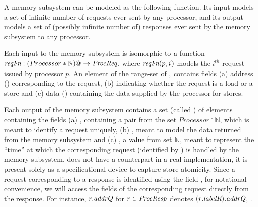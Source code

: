 A memory subsystem can be modeled as the following function. Its input models a
set of infinite number of requests ever sent by any processor, and its output
models a set of (possibly infinite number of) responses ever sent by the memory
subsystem to any processor.

Each input to the memory subsystem is isomorphic to a function
$\textit{reqFn}:(Processor*\mathbb{N}) @-> \textit{ProcReq}$, where $\textit{reqFn}(p, i)$ models the
$i^{th}$ request issued by processor $p$. An element of the range-set of
\reqFn{}, \viz \Request{} contains fields (a) address (\addrQ) corresponding to
the request, (b) \desc{} indicating whether the request is a load or a store
and (c) data (\dataQ) containing the data supplied by the processor for stores.

Each output of the memory subsystem contains a set (called \Response) of
elements containing the fields (a) , containing a pair from the set
$Processor*\mathbb{N}$, which is meant to identify a request uniquely, (b)
\dataR, meant to model the data returned from the memory subsystem and (c)
\timeR, a value from set $\mathbb{N}$, meant to represent the ``time'' at which
the corresponding request (identified by ) is handled by the memory
subsystem. \timeR{} does not have a counterpart in a real implementation, it is
present solely as a specificational device to capture store atomicity. Since a
request corresponding to a response is identified using the field , for
notational convenience, we will access the fields of the corresponding request
directly from the response. For instance, $r.\textit{addrQ}$ for $r \in \textit{ProcResp}$
denotes $(r.\textit{labelR}).\textit{addrQ}$, \etc.

